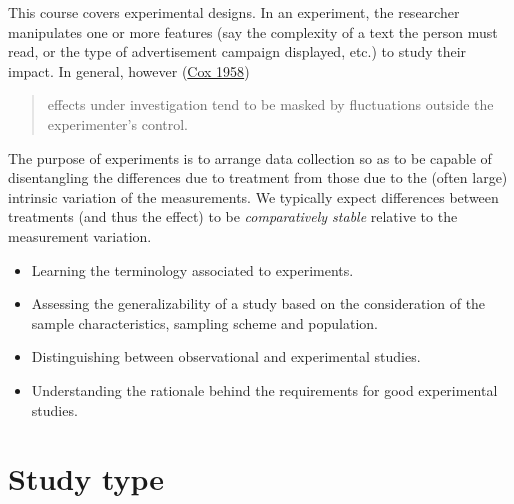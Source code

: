 \documentclass[
  11pt,
  letterpaper,
]{scrbook}
\providecommand{\tightlist}{%
  \setlength{\itemsep}{0pt}\setlength{\parskip}{0pt}}\usepackage{longtable,booktabs,array}
\theoremstyle{definition}
\theoremstyle{remark}
\begin{document}
This course covers experimental designs. In an experiment, the
researcher manipulates one or more features (say the complexity of a
text the person must read, or the type of advertisement campaign
displayed, etc.) to study their impact. In general, however
(\protect\hyperlink{ref-Cox:1958}{Cox 1958})

\begin{quote}
effects under investigation tend to be masked by fluctuations outside
the experimenter's control.
\end{quote}

The purpose of experiments is to arrange data collection so as to be
capable of disentangling the differences due to treatment from those due
to the (often large) intrinsic variation of the measurements. We
typically expect differences between treatments (and thus the effect) to
be \emph{comparatively stable} relative to the measurement variation.

\begin{tcolorbox}[enhanced jigsaw, breakable, toptitle=1mm, left=2mm, bottomrule=.15mm, colframe=quarto-callout-important-color-frame, colback=white, rightrule=.15mm, title=\textcolor{quarto-callout-important-color}{\faExclamation}\hspace{0.5em}{\textbf{Learning objectives}:}, opacityback=0, toprule=.15mm, titlerule=0mm, colbacktitle=quarto-callout-important-color!10!white, bottomtitle=1mm, arc=.35mm, coltitle=black, opacitybacktitle=0.6, leftrule=.75mm]

\begin{itemize}
\tightlist
\item
  Learning the terminology associated to experiments.
\item
  Assessing the generalizability of a study based on the consideration
  of the sample characteristics, sampling scheme and population.
\item
  Distinguishing between observational and experimental studies.
\item
  Understanding the rationale behind the requirements for good
  experimental studies.
\end{itemize}

\end{tcolorbox}

\hypertarget{study-type}{%
\section{Study type}\label{study-type}}
\end{document}
